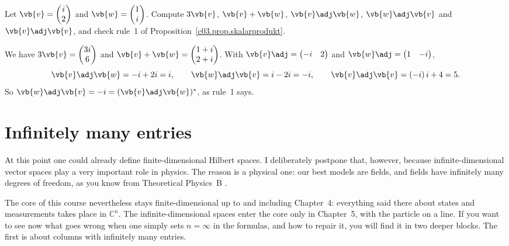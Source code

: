 \begin{exercise}\label{c03.exc.rechnen}
  Let $\vb{v} = \begin{pmatrix} i \\ 2 \end{pmatrix}$ and
  $\vb{w} = \begin{pmatrix} 1 \\ i \end{pmatrix}$. Compute $3\vb{v}$, $\vb{v} + \vb{w}$,
  $\vb{v}\adj\vb{w}$, $\vb{w}\adj\vb{v}$ and $\vb{v}\adj\vb{v}$, and check rule~1 of
  Proposition~\ref{c03.prop.skalarprodukt}.
\end{exercise}
\begin{solution}
  We have $3\vb{v} = \begin{pmatrix} 3i \\ 6 \end{pmatrix}$ and
  $\vb{v} + \vb{w} = \begin{pmatrix} 1+i \\ 2+i \end{pmatrix}$. With
  $\vb{v}\adj = \begin{pmatrix} -i & 2 \end{pmatrix}$ and
  $\vb{w}\adj = \begin{pmatrix} 1 & -i \end{pmatrix}$,
  \begin{equation}\label{c03.eq.rechnen}
    \vb{v}\adj\vb{w} = -i + 2i = i,
    \qquad
    \vb{w}\adj\vb{v} = i - 2i = -i,
    \qquad
    \vb{v}\adj\vb{v} = (-i)\,i + 4 = 5 .
  \end{equation}
  So $\vb{w}\adj\vb{v} = -i = (\vb{v}\adj\vb{w})^*$, as rule~1 says.
\end{solution}

\section{Infinitely many entries}\label{c03.s3}

At this point one could already define finite-dimensional Hilbert spaces. I deliberately
postpone that, however, because infinite-dimensional vector spaces play a very important role
in physics. The reason is a physical one: our best models are fields, and fields have
infinitely many degrees of freedom, as you know from Theoretical Physics~B
.

The core of this course nevertheless stays finite-dimensional up to and including Chapter~4:
everything said there about states and measurements takes place in $\mathbb{C}^n$. The
infinite-dimensional spaces enter the core only in Chapter~5, with the particle on a line.
If you want to see now what goes wrong when one simply sets $n = \infty$ in the formulas,
and how to repair it, you will find it in two deeper blocks. The first is about columns
with infinitely many entries.

